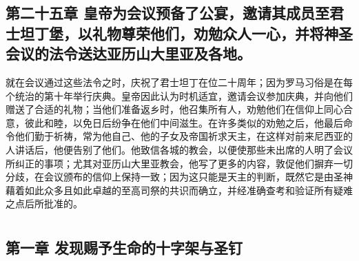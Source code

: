 
\subsection{第二十五章 皇帝为会议预备了公宴，邀请其成员至君士坦丁堡，以礼物尊荣他们，劝勉众人一心，并将神圣会议的法令送达亚历山大里亚及各地。}

就在会议通过这些法令之时，庆祝了君士坦丁在位二十周年；因为罗马习俗是在每个统治的第十年举行庆典。皇帝因此认为时机适宜，邀请会议参加庆典，并向他们赠送了合适的礼物；当他们准备返乡时，他召集所有人，劝勉他们在信仰上同心合意，彼此和睦，以免日后纷争在他们中间滋生。在许多类似的劝勉之后，他最后命令他们勤于祈祷，常为他自己、他的子女及帝国祈求天主，在这样对前来尼西亚的人讲话后，他便告别了他们。他致信各城的教会，以便使那些未出席的人明了会议所纠正的事项；尤其对亚历山大里亚教会，他写了更多的内容，敦促他们摒弃一切分歧，在会议颁布的信仰上保持一致；因为这只能是天主的判断，既然它是由圣神藉着如此众多且如此卓越的至高司祭的共识而确立，并经准确查考和验证所有疑难之点后所批准的。\par



\section{}


\subsection{第一章 发现赐予生命的十字架与圣钉}

